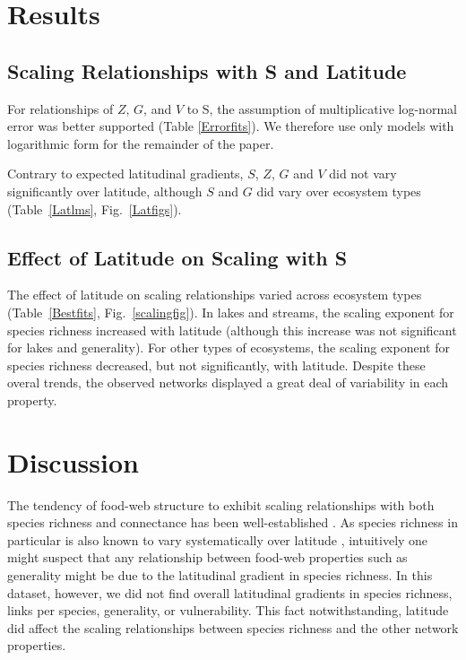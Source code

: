 \documentclass[12pt]{article}
\begin{document}
\section*{Results}

\subsection*{Scaling Relationships with S and Latitude}

For relationships of $Z$, $G$, and $V$ to S, the assumption of multiplicative log-normal error was better supported
(Table \ref{Errorfits}). We therefore use only models with logarithmic form for the remainder of the paper.


Contrary to expected latitudinal gradients, $S$, $Z$, $G$ and $V$ did not vary significantly over latitude, although $S$ and $G$ did vary over ecosystem types (Table~\ref{Latlms}, Fig.~\ref{Latfigs}).


\subsection*{Effect of Latitude on Scaling with S}

The effect of latitude on scaling relationships varied across ecosystem types
(Table~\ref{Bestfits}, Fig.~\ref{scalingfig}).  In lakes and streams, the
scaling exponent for species richness increased with latitude (although this
increase was not significant for lakes and generality). For other types of
ecosystems, the scaling  exponent for species richness decreased, but not significantly,
with latitude. Despite these overal trends, the observed networks displayed a great deal
of variability in each property. 



\section*{Discussion}

The tendency of food-web structure to exhibit scaling relationships with both
species richness and connectance has been well-established \citep{}. As
species richness in particular is also known to vary systematically over
latitude \citep{}, intuitively one might suspect that any relationship
between food-web properties such as generality might be due to the latitudinal
gradient in species richness. In this dataset, however, we did not find
overall latitudinal gradients in species richness, links per species, 
generality, or vulnerability. This fact notwithstanding, latitude did affect the
scaling relationships between species richness and the other network properties.
\end{document}

